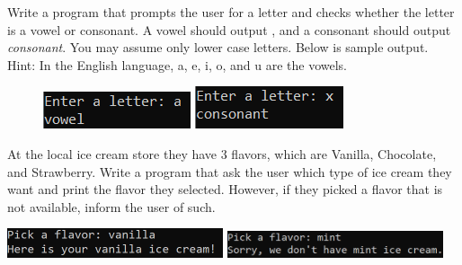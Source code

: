 	\item  
		Write a program that prompts the user for a letter and checks whether the letter is a vowel 
		or consonant.  A vowel should output \textit{}, and a consonant should output 
		\textit{consonant}.  You may assume only lower case letters. Below is sample output.\\
		Hint: In the English language, a, e, i, o, and u are the vowels.
	
		\begin{figure}[h]
		\centering
			\begin{minipage}{.5\textwidth}
			\centering
				\includegraphics[scale=1.2]{./imgs/vowelYesAlt.png}
			\end{minipage}%
			\begin{minipage}{.5\textwidth}
			\centering
				\includegraphics[scale=1.1]{./imgs/vowelNoAlt.png}
			\end{minipage}
		\end{figure}





	\item  
		At the local ice cream store they have 3 flavors, which are Vanilla, Chocolate, and 
		Strawberry. Write a program that ask the user which type of ice cream they want and print 
		the flavor they selected. However, if they picked a flavor that is not available, inform 
		the user of such.
	
		\hfill 
		\includegraphics[width = 2.5in]{./imgs/iceCreamFlavors1.PNG} \hfill 
		\includegraphics[width = 2.5in]{./imgs/iceCreamFlavors2.PNG} \hfill \ 




